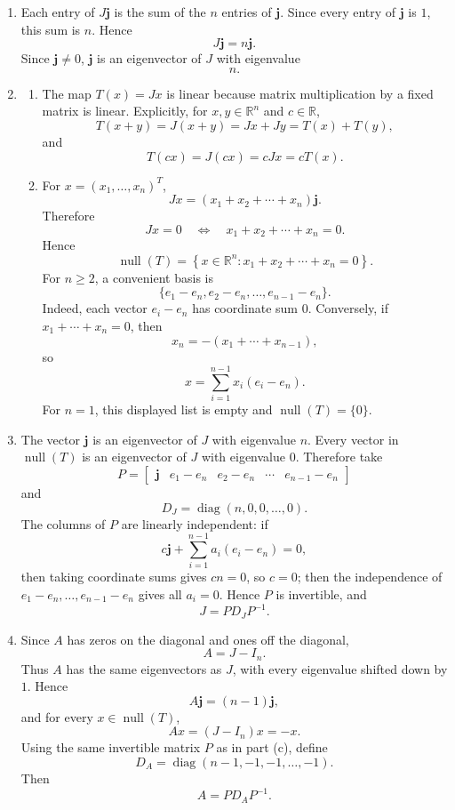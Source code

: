 \documentclass[12pt]{article}
\newcommand{\R}{\mathbb{R}}
\newcommand{\Null}{\operatorname{null}}
\newcommand{\diag}{\operatorname{diag}}
\begin{document}
\begin{enumerate}[label=(\alph*)]
  \item Each entry of $J\mathbf j$ is the sum of the $n$ entries of $\mathbf j$. Since every entry of $\mathbf j$ is $1$, this sum is $n$. Hence
  \[
  J\mathbf j=n\mathbf j.
  \]
  Since $\mathbf j\ne0$, $\mathbf j$ is an eigenvector of $J$ with eigenvalue
  \[
  \boxed{n.}
  \]

  \item
  \begin{enumerate}[label=(\roman*)]
    \item The map $T(x)=Jx$ is linear because matrix multiplication by a fixed matrix is linear. Explicitly, for $x,y\in\R^n$ and $c\in\R$,
    \[
    T(x+y)=J(x+y)=Jx+Jy=T(x)+T(y),
    \]
    and
    \[
    T(cx)=J(cx)=cJx=cT(x).
    \]

    \item For $x=(x_1,\ldots,x_n)^T$,
    \[
    Jx=(x_1+x_2+\cdots+x_n)\mathbf j.
    \]
    Therefore
    \[
    Jx=0
    \quad\Longleftrightarrow\quad
    x_1+x_2+\cdots+x_n=0.
    \]
    Hence
    \[
    \Null(T)=\left\{x\in\R^n:x_1+x_2+\cdots+x_n=0\right\}.
    \]
    For $n\ge2$, a convenient basis is
    \[
    \boxed{\{e_1-e_n,e_2-e_n,\ldots,e_{n-1}-e_n\}.}
    \]
    Indeed, each vector $e_i-e_n$ has coordinate sum $0$. Conversely, if $x_1+\cdots+x_n=0$, then
    \[
    x_n=-(x_1+\cdots+x_{n-1}),
    \]
    so
    \[
    x=\sum_{i=1}^{n-1}x_i(e_i-e_n).
    \]
    For $n=1$, this displayed list is empty and $\Null(T)=\{0\}$.
  \end{enumerate}

  \item The vector $\mathbf j$ is an eigenvector of $J$ with eigenvalue $n$. Every vector in $\Null(T)$ is an eigenvector of $J$ with eigenvalue $0$. Therefore take
  \[
  P=\begin{bmatrix}\mathbf j& e_1-e_n& e_2-e_n&\cdots& e_{n-1}-e_n\end{bmatrix}
  \]
  and
  \[
  D_J=\diag(n,0,0,\ldots,0).
  \]
  The columns of $P$ are linearly independent: if
  \[
  c\mathbf j+\sum_{i=1}^{n-1}a_i(e_i-e_n)=0,
  \]
  then taking coordinate sums gives $cn=0$, so $c=0$; then the independence of $e_1-e_n,\ldots,e_{n-1}-e_n$ gives all $a_i=0$. Hence $P$ is invertible, and
  \[
  \boxed{J=PD_JP^{-1}.}
  \]

  \item Since $A$ has zeros on the diagonal and ones off the diagonal,
  \[
  A=J-I_n.
  \]
  Thus $A$ has the same eigenvectors as $J$, with every eigenvalue shifted down by $1$. Hence
  \[
  A\mathbf j=(n-1)\mathbf j,
  \]
  and for every $x\in\Null(T)$,
  \[
  Ax=(J-I_n)x=-x.
  \]
  Using the same invertible matrix $P$ as in part (c), define
  \[
  D_A=\diag(n-1,-1,-1,\ldots,-1).
  \]
  Then
  \[
  \boxed{A=PD_AP^{-1}.}
  \]
\end{enumerate}
\end{document}
